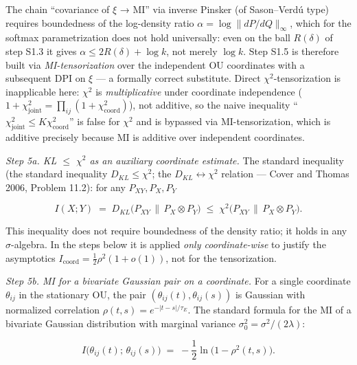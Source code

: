 \documentclass[pdflatex,sn-mathphys-ay]{sn-jnl}
\begin{document}
The chain ``covariance of \(\xi\) → MI'' via inverse Pinsker (of Sason--Verdú type) requires boundedness of the log-density ratio \(\alpha = \log\|dP/dQ\|_\infty\), which for the softmax parametrization does not hold universally: even on the ball \(R(\delta)\) of step S1.3 it gives \(\alpha \le 2R(\delta) + \log k\), not merely \(\log k\). Step S1.5 is therefore built via \emph{MI-tensorization} over the independent OU coordinates with a subsequent DPI on \(\xi\) --- a formally correct substitute. Direct \(\chi^2\)-tensorization is inapplicable here: \(\chi^2\) is \emph{multiplicative} under coordinate independence (\(1 + \chi^2_{\text{joint}} = \prod_{ij}(1 + \chi^2_{\text{coord}})\)), not additive, so the naive inequality ``\(\chi^2_{\text{joint}} \le K \chi^2_{\text{coord}}\)'' is false for \(\chi^2\) and is bypassed via MI-tensorization, which is additive precisely because MI is additive over independent coordinates.



\emph{Step 5a. KL \(\le\) \(\chi^2\) as an auxiliary coordinate estimate.} The standard inequality (the standard inequality \(D_{KL} \le \chi^2\); the \(D_{KL}\leftrightarrow\chi^2\) relation --- Cover and Thomas 2006, Problem 11.2): for any \(P_{XY}, P_X, P_Y\)



\[I(X; Y) \;=\; D_{KL}\bigl(P_{XY} \,\|\, P_X \otimes P_Y\bigr) \;\le\; \chi^2\bigl(P_{XY} \,\|\, P_X \otimes P_Y\bigr).\]



This inequality does not require boundedness of the density ratio; it holds in any \(\sigma\)-algebra. In the steps below it is applied \emph{only coordinate-wise} to justify the asymptotics \(I_{\text{coord}} = \tfrac{1}{2}\rho^2(1 + o(1))\), not for the tensorization.



\emph{Step 5b. MI for a bivariate Gaussian pair on a coordinate.} For a single coordinate \(\theta_{ij}\) in the stationary OU, the pair \((\theta_{ij}(t), \theta_{ij}(s))\) is Gaussian with normalized correlation \(\rho(t,s) = e^{-|t-s|/\tau_E}\). The standard formula for the MI of a bivariate Gaussian distribution with marginal variance \(\sigma_0^2 = \sigma^2/(2\lambda)\):



\begin{equation}I\bigl(\theta_{ij}(t);\, \theta_{ij}(s)\bigr) \;=\; -\frac{1}{2}\ln\bigl(1 - \rho^2(t,s)\bigr). \tag{S1.5a}\end{equation}
\end{document}
